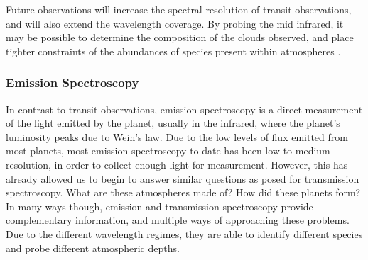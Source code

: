Future observations will increase the spectral resolution of transit observations, and will also extend the wavelength coverage. 
By probing the mid infrared, it may be possible to determine the composition of the clouds observed, and place tighter constraints of the abundances of species present within atmospheres \parencite{Kreidberg2018}.

\subsubsection{Emission Spectroscopy}
In contrast to transit observations, emission spectroscopy is a direct measurement of the light emitted by the planet, usually in the infrared, where the planet's luminosity peaks due to Wein's law.
Due to the low levels of flux emitted from most planets, most emission spectroscopy to date has been low to medium resolution, in order to collect enough light for measurement. 
However, this has already allowed us to begin to answer similar questions as posed for transmission spectroscopy.
What are these atmospheres made of? How did these planets form?
In many ways though, emission and transmission spectroscopy provide complementary information, and multiple ways of approaching these problems. 
Due to the different wavelength regimes, they are able to identify different species and probe different atmospheric depths. 

